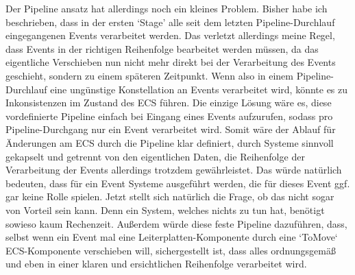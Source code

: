 \documentclass{article}
\begin{document}
    Der Pipeline ansatz hat allerdings noch ein kleines Problem.
    Bisher habe ich beschrieben, dass in der ersten `Stage' alle seit dem letzten Pipeline-Durchlauf eingegangenen Events verarbeitet werden.
    Das verletzt allerdings meine Regel, dass Events in der richtigen Reihenfolge bearbeitet werden müssen, da das eigentliche Verschieben
    nun nicht mehr direkt bei der Verarbeitung des Events geschieht, sondern zu einem späteren Zeitpunkt.
    Wenn also in einem Pipeline-Durchlauf eine ungünstige Konstellation an Events verarbeitet wird, könnte es zu Inkonsistenzen im Zustand
    des ECS führen.
    Die einzige Lösung wäre es, diese vordefinierte Pipeline einfach bei Eingang eines Events aufzurufen, sodass pro Pipeline-Durchgang
    nur ein Event verarbeitet wird.
    Somit wäre der Ablauf für Änderungen am ECS durch die Pipeline klar definiert, durch Systeme sinnvoll
    gekapselt und getrennt von den eigentlichen Daten, die Reihenfolge der Verarbeitung der Events allerdings trotzdem gewährleistet.
    Das würde natürlich bedeuten, dass für ein Event Systeme ausgeführt werden, die für dieses Event ggf. gar keine Rolle spielen.
    Jetzt stellt sich natürlich die Frage, ob das nicht sogar von Vorteil sein kann.
    Denn ein System, welches nichts zu tun hat, benötigt sowieso kaum Rechenzeit.
    Außerdem würde diese feste Pipeline dazuführen, dass, selbst wenn ein Event mal eine Leiterplatten-Komponente durch
    eine `ToMove` ECS-Komponente verschieben will, sichergestellt ist, dass alles ordnungsgemäß und eben in einer klaren
    und ersichtlichen Reihenfolge verarbeitet wird.
\end{document}
